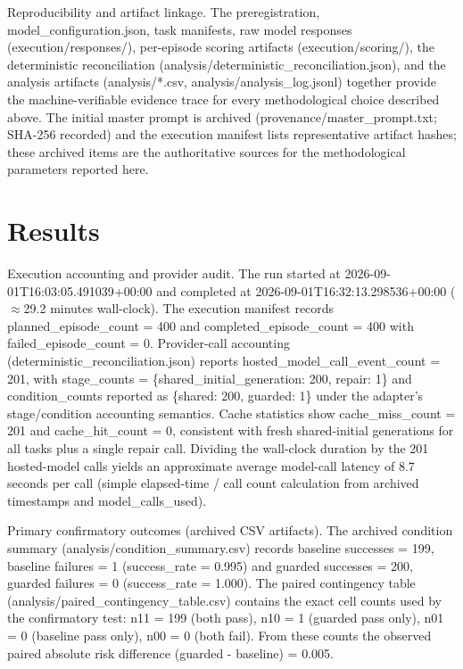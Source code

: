 \documentclass[conference]{IEEEtran}
\begin{document}
Reproducibility and artifact linkage. The preregistration, model\_configuration.json, task manifests, raw model responses (execution/responses/), per-episode scoring artifacts (execution/scoring/), the deterministic reconciliation (analysis/deterministic\_reconciliation.json), and the analysis artifacts (analysis/*.csv, analysis/analysis\_log.jsonl) together provide the machine-verifiable evidence trace for every methodological choice described above. The initial master prompt is archived (provenance/master\_prompt.txt; SHA-256 recorded) and the execution manifest lists representative artifact hashes; these archived items are the authoritative sources for the methodological parameters reported here.

\section{Results}
Execution accounting and provider audit. The run started at 2026-09-01T16:03:05.491039+00:00 and completed at 2026-09-01T16:32:13.298536+00:00 (\ensuremath{\approx}29.2 minutes wall-clock). The execution manifest records planned\_episode\_count = 400 and completed\_episode\_count = 400 with failed\_episode\_count = 0. Provider-call accounting (deterministic\_reconciliation.json) reports hosted\_model\_call\_event\_count = 201, with stage\_counts = \{shared\_initial\_generation: 200, repair: 1\} and condition\_counts reported as \{shared: 200, guarded: 1\} under the adapter's stage/condition accounting semantics. Cache statistics show cache\_miss\_count = 201 and cache\_hit\_count = 0, consistent with fresh shared-initial generations for all tasks plus a single repair call. Dividing the wall-clock duration by the 201 hosted-model calls yields an approximate average model-call latency of 8.7 seconds per call (simple elapsed-time / call count calculation from archived timestamps and model\_calls\_used).

Primary confirmatory outcomes (archived CSV artifacts). The archived condition summary (analysis/condition\_summary.csv) records baseline successes = 199, baseline failures = 1 (success\_rate = 0.995) and guarded successes = 200, guarded failures = 0 (success\_rate = 1.000). The paired contingency table (analysis/paired\_contingency\_table.csv) contains the exact cell counts used by the confirmatory test: n11 = 199 (both pass), n10 = 1 (guarded pass only), n01 = 0 (baseline pass only), n00 = 0 (both fail). From these counts the observed paired absolute risk difference (guarded - baseline) = 0.005.
\end{document}
